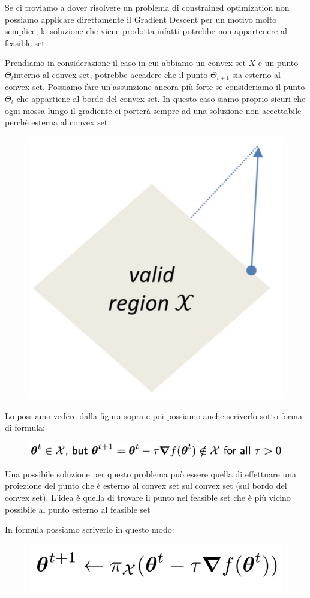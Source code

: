 \documentclass[14pt]{extreport}
\begin{document}
Se ci troviamo a dover risolvere un problema di constrained optimization non possiamo applicare direttamente il Gradient Descent per un motivo molto
semplice, la soluzione che viene prodotta infatti potrebbe non appartenere al feasible set.

Prendiamo in considerazione il caso in cui abbiamo un convex set $X$ e un punto $\Theta_t$interno al convex set, potrebbe accadere che il punto
$\Theta_{t+1}$ sia esterno al convex set. Possiamo fare un'assunzione ancora più forte se consideriamo il punto $\Theta_t$ che appartiene al bordo del
convex set. In questo caso siamo proprio sicuri che ogni mossa lungo il gradiente ci porterà sempre ad una soluzione non accettabile perchè esterna al
convex set.

\begin{figure}[H]
\centering
\includegraphics[width=0.4\linewidth]{282.jpeg}
\end{figure}

Lo possiamo vedere dalla figura sopra e poi possiamo anche scriverlo sotto forma di formula:

\begin{figure}[H]
\centering
\includegraphics[width=0.7\linewidth]{283.jpeg}
\end{figure}

Una possibile soluzione per questo problema può essere quella di effettuare una proiezione del punto che è esterno al convex set sul convex set (sul
bordo del convex set). L'idea è quella di trovare il punto nel feasible set che è più vicino possibile al punto esterno al feasible set

In formula possiamo scriverlo in questo modo:

\begin{figure}[H]
\centering
\includegraphics[width=0.5\linewidth]{284.jpeg}
\end{figure}
\end{document}
